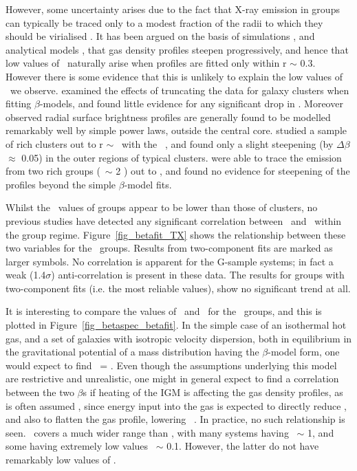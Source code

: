 \documentclass[usenatbib]{mn2e}
\begin{document}
However, some uncertainty arises due to the fact that X-ray emission in groups
can typically be traced only to a modest fraction of the radii to which they
should be virialised \citep{mulchaey00}.  It has been argued on the basis of
simulations \citep*{navarro95}, and analytical models \citep{wu02}, that gas
density profiles steepen progressively, and hence that low values of \betafit\
naturally arise when profiles are fitted only within r $\sim$ 0.3\rth.  However
there is some evidence that this is unlikely to explain the low values of
\betafit\ we observe.  \citet{sanderson03a} examined the effects of truncating
the data for galaxy clusters when fitting $\beta$-models, and found little
evidence for any significant drop in \betafit. Moreover observed radial surface
brightness profiles are generally found to be modelled remarkably well by simple
power laws, outside the central core.  \citealt*{vikhlinin99c} studied a sample
of rich clusters out to r $\sim$ \rth\ with the \ROSAT\ \PSPC, and found only a
slight steepening (by $\Delta\beta$ $\approx$ 0.05) in the outer regions of
typical clusters.  \citet{rasmussen04} were able to trace the emission from two
rich groups (\TX\ $\sim$ 2 \kev) out to \rfh, and found no evidence for
steepening of the profiles beyond the simple $\beta$-model fits.

Whilst the \betafit\ values of groups appear to be lower than those of clusters,
no previous studies have detected any significant correlation between \betafit\
and \TX\ within the group regime.  Figure~\ref{fig_betafit_TX} shows the
relationship between these two variables for the \GEMS\ groups. Results from
two-component fits are marked as larger symbols. No correlation is apparent for
the G-sample systems; in fact a weak (1.4$\sigma$) anti-correlation is present in
these data. The results for groups with two-component fits (i.e. the most
reliable values), show no significant trend at all.

It is interesting to compare the values of \betafit\ and \betaspec\ for the \GEMS\
groups, and this is plotted in Figure~\ref{fig_betaspec_betafit}.  In the simple
case of an isothermal hot gas, and a set of galaxies with isotropic velocity
dispersion, both in equilibrium in the gravitational potential of a mass
distribution having the $\beta$-model form, one would expect to find \betafit\ =
\betaspec.  Even though the assumptions underlying this model are restrictive and
unrealistic, one might in general expect to find a correlation between the two
$\beta$s if heating of the IGM is affecting the gas density profiles, as is often
assumed \citep*{cavaliere99,balogh99}, since energy input into the gas
is expected to directly reduce \betaspec, and also to flatten the gas profile,
lowering \betafit\ \citep[c.f.][]{muanwong02}.  In practice, no such relationship
is seen. \betaspec\ covers a much wider range than \betafit, with many systems
having \betaspec\ $\sim$ 1, and some having extremely low values \betaspec\
$\sim$ 0.1.  However, the latter do not have remarkably low values of \betafit.
\end{document}
